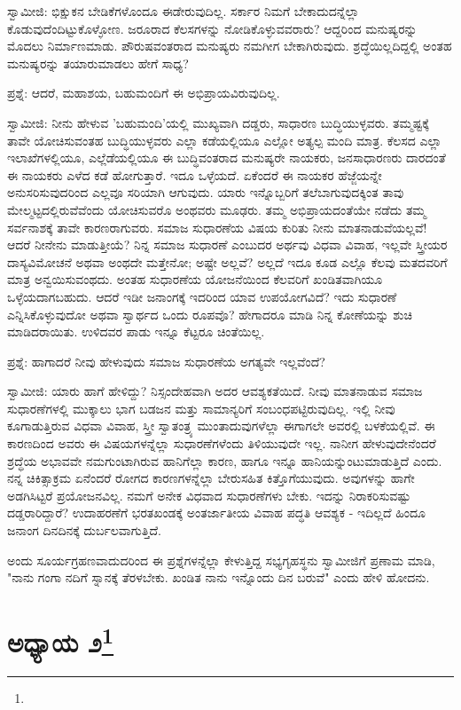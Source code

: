 ಸ್ವಾಮೀಜಿ: ಭಿಕ್ಷುಕನ ಬೇಡಿಕೆಗಳೊಂದೂ ಈಡೇರುವುದಿಲ್ಲ. ಸರ್ಕಾರ ನಿಮಗೆ ಬೇಕಾದುದನ್ನೆಲ್ಲಾ ಕೊಡುವುದೆಂದಿಟ್ಟುಕೊಳ್ಳೋಣ. ಜರೂರಾದ ಕೆಲಸಗಳನ್ನು ನೋಡಿಕೊಳ್ಳುವವರಾರು? ಆದ್ದರಿಂದ ಮನುಷ್ಯರನ್ನು ಮೊದಲು ನಿರ್ಮಾಣಮಾಡು. ಪೌರುಷವಂತರಾದ ಮನುಷ್ಯರು ನಮಗೀಗ ಬೇಕಾಗಿರುವುದು. ಶ್ರದ್ಧೆಯಿಲ್ಲದಿದ್ದಲ್ಲಿ ಅಂತಹ ಮನುಷ್ಯರನ್ನು ತಯಾರುಮಾಡಲು ಹೇಗೆ ಸಾಧ್ಯ?

ಪ್ರಶ್ನೆ: ಆದರೆ, ಮಹಾಶಯ, ಬಹುಮಂದಿಗೆ ಈ ಅಭಿಪ್ರಾಯವಿರುವುದಿಲ್ಲ.

ಸ್ವಾಮೀಜಿ: ನೀನು ಹೇಳುವ 'ಬಹುಮಂದಿ'ಯಲ್ಲಿ ಮುಖ್ಯವಾಗಿ ದಡ್ಡರು, ಸಾಧಾರಣ ಬುದ್ಧಿಯುಳ್ಳವರು. ತಮ್ಮಷ್ಟಕ್ಕೆ ತಾವೇ ಯೋಚಿಸುವಂತಹ ಬುದ್ಧಿಯುಳ್ಳವರು ಎಲ್ಲಾ ಕಡೆಯಲ್ಲಿಯೂ ಎಲ್ಲೋ ಅತ್ಯಲ್ಪ ಮಂದಿ ಮಾತ್ರ. ಕೆಲಸದ ಎಲ್ಲಾ ಇಲಾಖೆಗಳಲ್ಲಿಯೂ, ಎಲ್ಲೆಡೆಯಲ್ಲಿಯೂ ಈ ಬುದ್ಧಿವಂತರಾದ ಮನುಷ್ಯರೇ ನಾಯಕರು, ಜನಸಾಧಾರಣರು ದಾರದಂತೆ ಈ ನಾಯಕರು ಎಳೆದ ಕಡೆ ಹೋಗುತ್ತಾರೆ. ಇದೂ ಒಳ್ಳೆಯದೆ. ಏಕೆಂದರೆ ಈ ನಾಯಕರ ಹೆಜ್ಜೆಯನ್ನೇ ಅನುಸರಿಸುವುದರಿಂದ ಎಲ್ಲವೂ ಸರಿಯಾಗಿ ಆಗುವುದು. ಯಾರು ಇನ್ನೊಬ್ಬರಿಗೆ ತಲೆಬಾಗುವುದಕ್ಕಿಂತ ತಾವು ಮೇಲ್ಮಟ್ಟದಲ್ಲಿರುವೆವೆಂದು ಯೋಚಿಸುವರೊ ಅಂಥವರು ಮೂಢರು. ತಮ್ಮ ಅಭಿಪ್ರಾಯದಂತೆಯೇ ನಡೆದು ತಮ್ಮ ಸರ್ವನಾಶಕ್ಕೆ ತಾವೇ ಕಾರಣರಾಗುವರು. ಸಮಾಜ ಸುಧಾರಣೆಯ ವಿಷಯ ಕುರಿತು ನೀನು ಮಾತನಾಡುವೆಯಲ್ಲವೆ! ಆದರೆ ನೀನೇನು ಮಾಡುತ್ತೀಯೆ? ನಿನ್ನ ಸಮಾಜ ಸುಧಾರಣೆ ಎಂಬುದರ ಅರ್ಥವು ವಿಧವಾ ವಿವಾಹ, ಇಲ್ಲವೇ ಸ್ತ್ರೀಯರ ದಾಸ್ಯವಿಮೋಚನೆ ಅಥವಾ ಅಂಥದೇ ಮತ್ತೇನೋ; ಅಷ್ಟೇ ಅಲ್ಲವೆ? ಅಲ್ಲದೆ ಇದೂ ಕೂಡ ಎಲ್ಲೊ ಕೆಲವು ಮತದವರಿಗೆ ಮಾತ್ರ ಅನ್ವಯಿಸುವಂಥದು. ಅಂತಹ ಸುಧಾರಣೆಯ ಯೋಜನೆಯಿಂದ ಕೆಲವರಿಗೆ ಖಂಡಿತವಾಗಿಯೂ ಒಳ್ಳೆಯದಾಗಬಹುದು. ಆದರೆ ಇಡೀ ಜನಾಂಗಕ್ಕೆ ಇದರಿಂದ ಯಾವ ಉಪಯೋಗವಿದೆ? ಇದು ಸುಧಾರಣೆ ಎನ್ನಿಸಿಕೊಳ್ಳುವುದೋ ಅಥವಾ ಸ್ವಾರ್ಥದ ಒಂದು ರೂಪವೊ? ಹೇಗಾದರೂ ಮಾಡಿ ನಿನ್ನ ಕೋಣೆಯನ್ನು ಶುಚಿ ಮಾಡಿದರಾಯಿತು. ಉಳಿದವರ ಪಾಡು ಇನ್ನೂ ಕೆಟ್ಟರೂ ಚಿಂತೆಯಿಲ್ಲ.

ಪ್ರಶ್ನೆ: ಹಾಗಾದರೆ ನೀವು ಹೇಳುವುದು ಸಮಾಜ ಸುಧಾರಣೆಯ ಅಗತ್ಯವೇ ಇಲ್ಲವೆಂದೆ?

ಸ್ವಾಮೀಜಿ: ಯಾರು ಹಾಗೆ ಹೇಳಿದ್ದು? ನಿಸ್ಸಂದೇಹವಾಗಿ ಅದರ ಆವಶ್ಯಕತೆಯಿದೆ. ನೀವು ಮಾತನಾಡುವ ಸಮಾಜ ಸುಧಾರಣೆಗಳಲ್ಲಿ ಮುಕ್ಕಾಲು ಭಾಗ ಬಡಜನ ಮತ್ತು ಸಾಮಾನ್ಯರಿಗೆ ಸಂಬಂಧಪಟ್ಟಿರುವುದಿಲ್ಲ. ಇಲ್ಲಿ ನೀವು ಕೂಗಾಡುತ್ತಿರುವ ವಿಧವಾ ವಿವಾಹ, ಸ್ತ್ರೀ ಸ್ವಾತಂತ್ರ್ಯ ಮುಂತಾದುವುಗಳೆಲ್ಲಾ ಈಗಾಗಲೇ ಅವರಲ್ಲಿ ಬಳಕೆಯಲ್ಲಿವೆ. ಈ ಕಾರಣದಿಂದ ಅವರು ಈ ವಿಷಯಗಳನ್ನೆಲ್ಲಾ ಸುಧಾರಣೆಗಳೆಂದು ತಿಳಿಯುವುದೇ ಇಲ್ಲ. ನಾನೀಗ ಹೇಳುವುದೇನೆಂದರೆ ಶ್ರದ್ಧೆಯ ಅಭಾವವೇ ನಮಗುಂಟಾಗಿರುವ ಹಾನಿಗೆಲ್ಲಾ ಕಾರಣ, ಹಾಗೂ ಇನ್ನೂ ಹಾನಿಯನ್ನುಂಟುಮಾಡುತ್ತಿದೆ ಎಂದು. ನನ್ನ ಚಿಕಿತ್ಸಾಕ್ರಮ ಏನೆಂದರೆ ರೋಗದ ಕಾರಣಗಳನ್ನೆಲ್ಲಾ ಬೇರುಸಹಿತ ಕಿತ್ತೊಗೆಯುವುದು. ಅವುಗಳನ್ನು ಹಾಗೇ ಅಡಗಿಸಿಟ್ಟರೆ ಪ್ರಯೋಜನವಿಲ್ಲ. ನಮಗೆ ಅನೇಕ ವಿಧವಾದ ಸುಧಾರಣೆಗಳು ಬೇಕು. ಇದನ್ನು ನಿರಾಕರಿಸುವಷ್ಟು ದಡ್ಡರಾರಿದ್ದಾರೆ? ಉದಾಹರಣೆಗೆ ಭರತಖಂಡಕ್ಕೆ ಅಂತರ್ಜಾತೀಯ ವಿವಾಹ ಪದ್ಧತಿ ಆವಶ್ಯಕ - ಇದಿಲ್ಲದೆ ಹಿಂದೂ ಜನಾಂಗ ದಿನದಿನಕ್ಕೆ ದುರ್ಬಲವಾಗುತ್ತಿದೆ.

ಅಂದು ಸೂರ್ಯಗ್ರಹಣವಾದುದರಿಂದ ಈ ಪ್ರಶ್ನೆಗಳನ್ನೆಲ್ಲಾ ಕೇಳುತ್ತಿದ್ದ ಸಭ್ಯಗೃಹಸ್ಥನು ಸ್ವಾಮೀಜಿಗೆ ಪ್ರಣಾಮ ಮಾಡಿ, "ನಾನು ಗಂಗಾ ನದಿಗೆ ಸ್ನಾನಕ್ಕೆ ತೆರಳಬೇಕು. ಖಂಡಿತ ನಾನು ಇನ್ನೊಂದು ದಿನ ಬರುವೆ" ಎಂದು ಹೇಳಿ ಹೋದನು.

\newpage

\chapter[ಅಧ್ಯಾಯ ೨]{ಅಧ್ಯಾಯ ೨\protect\footnote{}}

